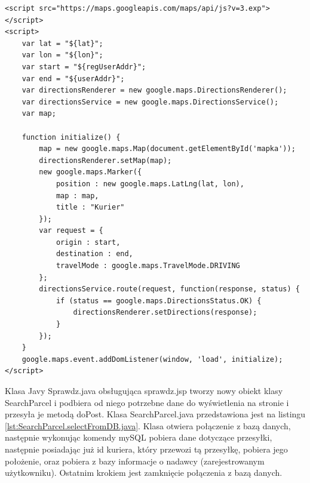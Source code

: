 \documentclass[eng,printmode,oneside]{mgr}
\begin{document}
\begin{lstlisting}[caption=Kody JavaScript'owy pobierający mapę z
serwera Google,label=lst:maps.JS] 
<script src="https://maps.googleapis.com/maps/api/js?v=3.exp"></script> 
<script>
	var lat = "${lat}";
	var lon = "${lon}";
	var start = "${regUserAddr}";
	var end = "${userAddr}";
	var directionsRenderer = new google.maps.DirectionsRenderer();
	var directionsService = new google.maps.DirectionsService();
	var map;

	function initialize() {
		map = new google.maps.Map(document.getElementById('mapka'));
		directionsRenderer.setMap(map);
		new google.maps.Marker({
			position : new google.maps.LatLng(lat, lon),
			map : map,
			title : "Kurier"
		});
		var request = {
			origin : start,
			destination : end,
			travelMode : google.maps.TravelMode.DRIVING
		};
		directionsService.route(request, function(response, status) {
			if (status == google.maps.DirectionsStatus.OK) {
				directionsRenderer.setDirections(response);
			}
		});
	}
	google.maps.event.addDomListener(window, 'load', initialize);
</script>
\end{lstlisting}

Klasa Javy Sprawdz.java obsługująca sprawdz.jsp tworzy nowy obiekt klasy
SearchParcel i podbiera od niego potrzebne dane do wyświetlenia na stronie i
przesyła je metodą doPost. Klasa SearchParcel.java przedstawiona jest na
listingu \ref{lst:SearchParcel.selectFromDB.java}. Klasa otwiera połączenie z bazą danych,
następnie wykonując komendy mySQL pobiera dane dotyczące przesyłki, następnie
posiadając już id kuriera, który przewozi tą przesyłkę, pobiera jego położenie,
oraz pobiera z bazy informacje o nadawcy (zarejestrowanym użytkowniku). Ostatnim
krokiem jest zamknięcie połączenia z bazą danych.
\end{document}
